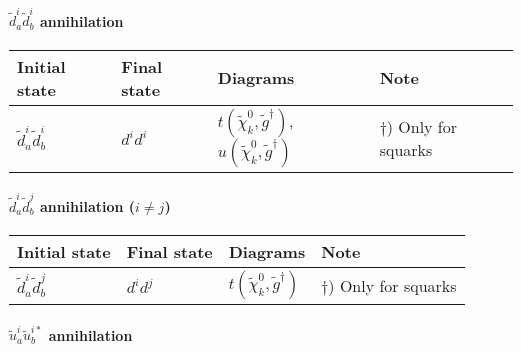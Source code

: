 \paragraph{$\tilde{d}^i_{a}\tilde{d}_{b}^{i}$ annihilation}

\begin{center}
\begin{tabular}{llll} \hline
{\bfseries Initial state} & {\bfseries Final state} &
{\bfseries Diagrams} & {\bfseries Note} \\ \hline \tabspace
$\tilde{d}^i_a\tilde{d}^{i}_b$ & $d^i d^i$ &
$t(\tilde{\chi}_{k}^0,\tilde{g}^\dagger)$, $u(\tilde{\chi}_{k}^0,\tilde{g}^\dagger)$ 
& $\dagger$) Only for squarks \\ \hline
\end{tabular}
\end{center}

\paragraph{$\tilde{d}^i_{a}\tilde{d}_{b}^{j}$ annihilation ($i \ne j$)}

\begin{center}
\begin{tabular}{llll} \hline
{\bfseries Initial state} & {\bfseries Final state} &
{\bfseries Diagrams} & {\bfseries Note} \\ \hline \tabspace
$\tilde{d}^i_a\tilde{d}^{j}_b$ & $d^i d^j$ &
$t(\tilde{\chi}_{k}^0,\tilde{g}^\dagger)$
& $\dagger$) Only for squarks \\ \hline
\end{tabular}
\end{center}

\paragraph{$\tilde{u}^i_{a}\tilde{u}_{b}^{i*}$ annihilation}

